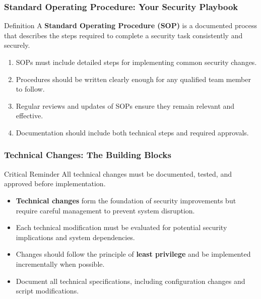 \documentclass{beamer}
\begin{document}
        \begin{frame}
        \frametitle{Standard Operating Procedure: Your Security Playbook}
        \begin{block}{Definition}
        A \textbf{Standard Operating Procedure (SOP)} is a documented process that describes the steps required to complete a security task consistently and securely.
        \end{block}
        \begin{enumerate}
            \item SOPs must include detailed steps for implementing common security changes.
            
            \item Procedures should be written clearly enough for any qualified team member to follow.
            
            \item Regular reviews and updates of SOPs ensure they remain relevant and effective.
            
            \item Documentation should include both technical steps and required approvals.
        \end{enumerate}
        \end{frame}

        \begin{frame}
            \frametitle{Technical Changes: The Building Blocks}
            \begin{alertblock}{Critical Reminder}
            All technical changes must be documented, tested, and approved before implementation.
            \end{alertblock}
            \begin{itemize}
                \item \textbf{Technical changes} form the foundation of security improvements but require careful management to prevent system disruption.
                
                \item Each technical modification must be evaluated for potential security implications and system dependencies.
                
                \item Changes should follow the principle of \textbf{least privilege} and be implemented incrementally when possible.
                
                \item Document all technical specifications, including configuration changes and script modifications.
            \end{itemize}
            \end{frame}
            
\end{document}

